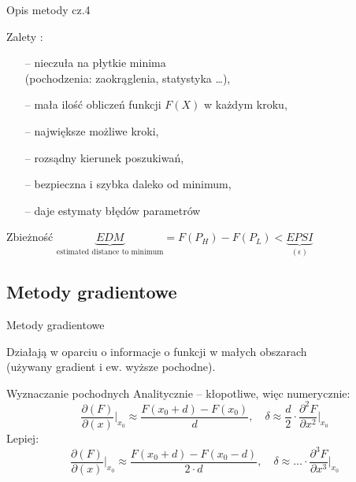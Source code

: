   \begin{frame}{Opis metody cz.4}

	\begin{block}{Zalety :}
	  	\begin{itemize}
	  		\item[--] nieczuła na płytkie minima
	  		\\(pochodzenia: zaokrąglenia, statystyka \ldots),
	  		\item[--] mała ilość obliczeń funkcji $F(X)$ w każdym kroku,
	  		\item[--] największe możliwe kroki,
	  		\item[--] rozsądny kierunek poszukiwań,
	  		\item[--] bezpieczna i szybka daleko od minimum,
	  		\item[--] daje estymaty błędów parametrów
	  	\end{itemize}
    \end{block}
    \begin{block}{Zbieżność}
	  	$\underbrace{EDM}_{ \text{estimated distance to minimum}} = F(P_H) - F(P_L) < \underbrace{EPSI}_{(\epsilon)}$
    \end{block}

  \end{frame}

\subsection{Metody gradientowe}

  \begin{frame}{Metody gradientowe}

 	Działają w oparciu o informacje o funkcji w małych obszarach
 	\\(używany gradient i ew. wyższe pochodne).
    \begin{block}{Wyznaczanie pochodnych}
 	   Analitycznie -- kłopotliwe, więc numerycznie:
 	   \begin{displaymath}
 	   	  \frac{\partial (F)}{\partial (x)} \bigg\vert_{x_0} \approx \frac{F(x_0+d) - F(x_0)}{d},
 	   	  \quad \delta \approx \frac{d}{2} \cdot \frac{\partial^2 F}{\partial x^2} \bigg\vert_{x_0}
 	   \end{displaymath}
 	   Lepiej:
 	   \begin{displaymath}
 	   	  \frac{\partial (F)}{\partial (x)} \bigg\vert_{x_0} \approx \frac{F(x_0+d) - F(x_0-d)}{2\cdot d},
 	   	  \quad \delta \approx ... \cdot \frac{\partial^3 F}{\partial x^3} \bigg\vert_{x_0}
 	   \end{displaymath}
  	\end{block}

  \end{frame}

